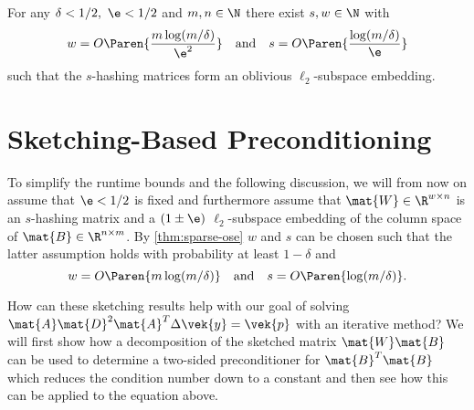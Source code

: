 \begin{theorem}\label{thm:sparse-ose}
For any \(\delta < 1/2, \ \e < 1/2\) and \(m, n \in \N\) there exist \(s, w \in \N\) with
\[ w = O \Paren{\frac{m \log(m/\delta)}{\e^2}} \quad \text{and} \quad s = O \Paren{\frac{\log(m/\delta)}{\e}} \]
such that the \(s\)-hashing matrices form an oblivious \(\ell_2\)-subspace embedding.
\end{theorem}

\section{Sketching-Based Preconditioning}\label{sec:sketching-preconditioning}

To simplify the runtime bounds and the following discussion, we will from now on assume that \(\e < 1/2\) is fixed and furthermore assume that \(\mat{W} \in \R^{w \times n}\) is an \(s\)-hashing matrix and a \((1\pm\e)\) \(\ell_2\)-subspace embedding of the column space of \(\mat{B} \in \R^{n \times m}\).
By \cref{thm:sparse-ose} \(w\) and \(s\) can be chosen such that the latter assumption holds with probability at least \(1 - \delta\) and 
\begin{equation} \label{eqn:sparse-ose-params}
  w = O \Paren{m \log(m/\delta)} \quad \text{and} \quad s = O \Paren{\log(m/\delta)}.
\end{equation}

How can these sketching results help with our goal of solving \(\mat{A} \mat{D}^2 \mat{A}^T \Delta\vek{y} = \vek{p}\) with an iterative method?
We will first show how a decomposition of the sketched matrix \(\mat{W}\mat{B}\) can be used to determine a two-sided preconditioner for \(\mat{B}^T \mat{B}\) which reduces the condition number down to a constant and then see how this can be applied to the equation above.

